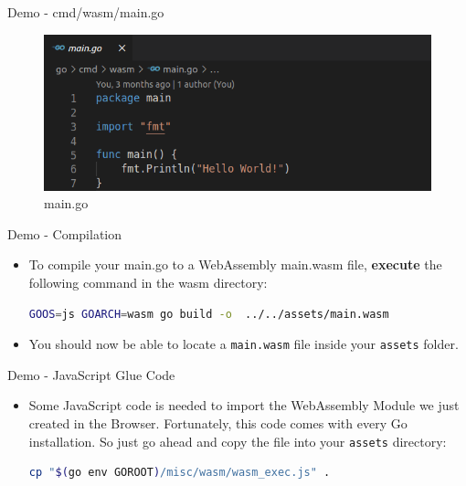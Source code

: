\documentclass{beamer}
\begin{document}
\begin{frame}{Demo - cmd/wasm/main.go}
    \begin{figure}
        \includegraphics[scale=0.5]{./images/main2.png}
        \caption{main.go}
    \end{figure}
\end{frame}

\begin{frame}[fragile]{Demo - Compilation}
    \begin{itemize}
    \item To compile your main.go to a WebAssembly main.wasm file, \textbf{execute} the following command in the wasm directory:
    \begin{lstlisting}[language=Bash,basicstyle=\scriptsize]
GOOS=js GOARCH=wasm go build -o  ../../assets/main.wasm
    \end{lstlisting}
    
    \item You should now be able to locate a \lstinline{main.wasm} file inside your \lstinline{assets} folder.
\end{itemize}
\end{frame}

\begin{frame}[fragile]{Demo - JavaScript Glue Code}
    \begin{itemize}
    \item Some JavaScript code is needed to import the WebAssembly Module we just created in the Browser. Fortunately, this code comes with every Go installation. So just go ahead and copy the file into your \lstinline{assets} directory:

    \begin{lstlisting}[language=Bash,basicstyle=\scriptsize]
cp "$(go env GOROOT)/misc/wasm/wasm_exec.js" .
\end{lstlisting}
\end{itemize}
\end{frame}
\end{document}
